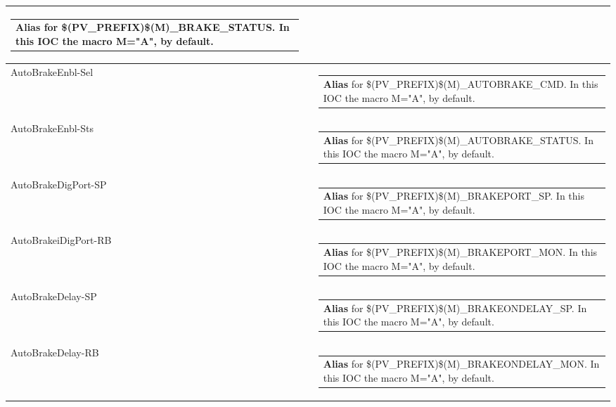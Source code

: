 \documentclass[openany]{article}
\begin{document}
\begin{longtable}{| m{4.5cm} m{2.5cm}  m{8.5cm} |}
\begin{tabular}{@{}m{6cm}@{}}
                \textbf{\color{blue} Alias} for \$(PV\_PREFIX)\$(M)\_BRAKE\_STATUS. In this IOC the macro M="A", by default.
            \end{tabular} \hypertarget{pv:auto-brake-enbl}{}\\ \hline
        AutoBrakeEnbl-Sel &  & \begin{tabular}{@{}m{6cm}@{}}
                \textbf{\color{blue} Alias} for \$(PV\_PREFIX)\$(M)\_AUTOBRAKE\_CMD. In this IOC the macro M="A", by default.
            \end{tabular} \hypertarget{}{}\\ \hline
        AutoBrakeEnbl-Sts &  & \begin{tabular}{@{}m{6cm}@{}}
                \textbf{\color{blue} Alias} for \$(PV\_PREFIX)\$(M)\_AUTOBRAKE\_STATUS. In this IOC the macro M="A", by default.
            \end{tabular} \hypertarget{pv:auto-brake-dig-port}{}\\ \hline
        AutoBrakeDigPort-SP &  & \begin{tabular}{@{}m{6cm}@{}}
                \textbf{\color{blue} Alias} for \$(PV\_PREFIX)\$(M)\_BRAKEPORT\_SP. In this IOC the macro M="A", by default.
            \end{tabular} \hypertarget{}{}\\ \hline
        AutoBrakeiDigPort-RB &  & \begin{tabular}{@{}m{6cm}@{}}
                \textbf{\color{blue} Alias} for \$(PV\_PREFIX)\$(M)\_BRAKEPORT\_MON. In this IOC the macro M="A", by default.
            \end{tabular} \hypertarget{pv:auto-brake-delay}{}\\ \hline
        AutoBrakeDelay-SP &  & \begin{tabular}{@{}m{6cm}@{}}
                \textbf{\color{blue} Alias} for \$(PV\_PREFIX)\$(M)\_BRAKEONDELAY\_SP. In this IOC the macro M="A", by default.
            \end{tabular} \hypertarget{}{}\\ \hline
        AutoBrakeDelay-RB &  & \begin{tabular}{@{}m{6cm}@{}}
                \textbf{\color{blue} Alias} for \$(PV\_PREFIX)\$(M)\_BRAKEONDELAY\_MON. In this IOC the macro M="A", by default.
            \end{tabular} \hypertarget{pv:lim-sw-dsbl}{}\\ \hline

\end{longtable}
\end{document}
